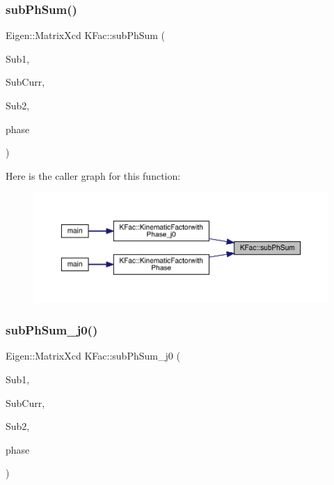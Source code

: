 \mbox{\label{namespaceKFac_ac23a25c1e9762e3c46e69835193075df}} 
\subsubsection{\texorpdfstring{subPhSum()}{subPhSum()}\hspace{0.1cm}{\footnotesize\ttfamily [2/2]}}
{\footnotesize\ttfamily Eigen\+::\+Matrix\+Xcd K\+Fac\+::sub\+Ph\+Sum (\begin{DoxyParamCaption}\item[{map$<$ int, Eigen\+::\+Matrix\+Xcd $>$ \&}]{Sub1,  }\item[{map$<$ int, Eigen\+::\+Matrix\+Xcd $>$ \&}]{Sub\+Curr,  }\item[{map$<$ int, Eigen\+::\+Matrix\+Xcd $>$ \&}]{Sub2,  }\item[{\mbox{\hyperlink{structPh_1_1phChars}{Ph\+::ph\+Chars}} \&}]{phase }\end{DoxyParamCaption})}

Here is the caller graph for this function\+:
\nopagebreak
\begin{figure}[H]
\begin{center}
\leavevmode
\includegraphics[width=350pt]{d2/d89/namespaceKFac_ac23a25c1e9762e3c46e69835193075df_icgraph}
\end{center}
\end{figure}
\mbox{\label{namespaceKFac_abb86856b8424632f8f879408ce2cc05b}} 
\subsubsection{\texorpdfstring{subPhSum\_j0()}{subPhSum\_j0()}}
{\footnotesize\ttfamily Eigen\+::\+Matrix\+Xcd K\+Fac\+::sub\+Ph\+Sum\+\_\+j0 (\begin{DoxyParamCaption}\item[{map$<$ int, Eigen\+::\+Matrix\+Xcd $>$ \&}]{Sub1,  }\item[{Eigen\+::\+Matrix\+Xcd \&}]{Sub\+Curr,  }\item[{map$<$ int, Eigen\+::\+Matrix\+Xcd $>$ \&}]{Sub2,  }\item[{\mbox{\hyperlink{structPh_1_1phChars}{Ph\+::ph\+Chars}} \&}]{phase }\end{DoxyParamCaption})}

